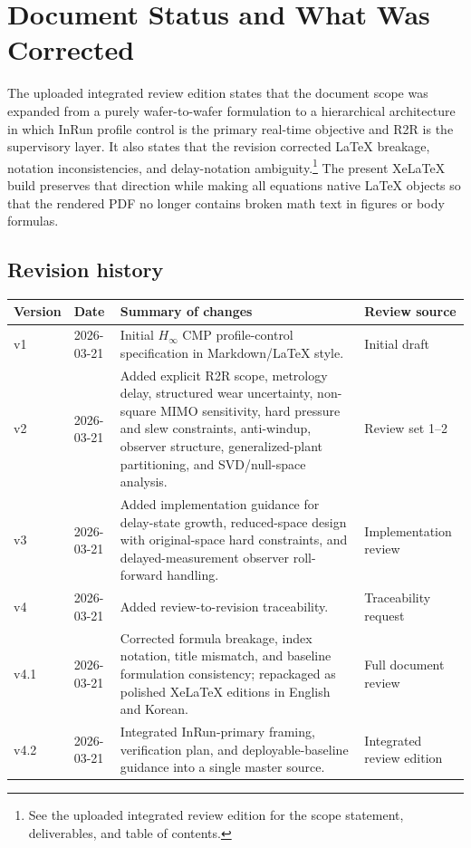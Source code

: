 \documentclass[11pt,a4paper]{article}
\begin{document}
\tableofcontents
\newpage

\section{Document Status and What Was Corrected}
The uploaded integrated review edition states that the document scope was expanded from a purely wafer-to-wafer formulation to a hierarchical architecture in which InRun profile control is the primary real-time objective and R2R is the supervisory layer. It also states that the revision corrected LaTeX breakage, notation inconsistencies, and delay-notation ambiguity.\footnote{See the uploaded integrated review edition for the scope statement, deliverables, and table of contents.} The present XeLaTeX build preserves that direction while making all equations native LaTeX objects so that the rendered PDF no longer contains broken math text in figures or body formulas.\par

\subsection{Revision history}
\begin{longtable}{p{1.5cm}p{1.8cm}p{8.4cm}p{3.0cm}}
\toprule
\textbf{Version} & \textbf{Date} & \textbf{Summary of changes} & \textbf{Review source} \\
\midrule
\endhead
v1 & 2026-03-21 & Initial $H_{\infty}$ CMP profile-control specification in Markdown/LaTeX style. & Initial draft \\
v2 & 2026-03-21 & Added explicit R2R scope, metrology delay, structured wear uncertainty, non-square MIMO sensitivity, hard pressure and slew constraints, anti-windup, observer structure, generalized-plant partitioning, and SVD/null-space analysis. & Review set 1--2 \\
v3 & 2026-03-21 & Added implementation guidance for delay-state growth, reduced-space design with original-space hard constraints, and delayed-measurement observer roll-forward handling. & Implementation review \\
v4 & 2026-03-21 & Added review-to-revision traceability. & Traceability request \\
v4.1 & 2026-03-21 & Corrected formula breakage, index notation, title mismatch, and baseline formulation consistency; repackaged as polished XeLaTeX editions in English and Korean. & Full document review \\
v4.2 & 2026-03-21 & Integrated InRun-primary framing, verification plan, and deployable-baseline guidance into a single master source. & Integrated review edition \\
\bottomrule
\end{longtable}
\end{document}
